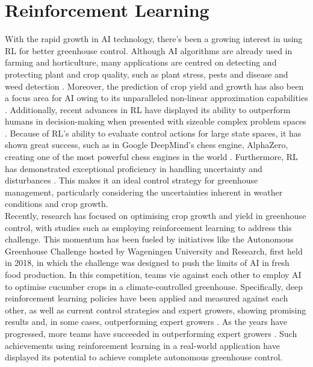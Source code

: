 \section{Reinforcement Learning}\label{section:RL}

With the rapid growth in AI technology, there’s been a growing interest in using RL for better greenhouse control. Although AI algorithms are already used in farming and horticulture, many applications are centred on detecting and protecting plant and crop quality, such as plant stress, pests and disease and weed detection \cite{hemmingCherryTomatoProduction2020}. Moreover, the prediction of crop yield and growth has also been a focus area for AI owing to its unparalleled non-linear approximation capabilities \cite{gongDeepLearningBased2021}. Additionally, recent advances in RL have displayed its ability to outperform humans in decision-making when presented with sizeable complex problem spaces \cite{bonsaiWhyReinforcementLearning2017}. Because of RL's ability to evaluate control actions for large state spaces, it has shown great success, such as in Google DeepMind's chess engine, AlphaZero, creating one of the most powerful chess engines in the world \cite{bertsekasLessonsAlphaZeroOptimal}. Furthermore, RL has demonstrated exceptional proficiency in handling uncertainty and disturbances \cite{daaboulUncertaintyPredictionModelbased2020}. This makes it an ideal control strategy for greenhouse management, particularly considering the uncertainties inherent in weather conditions and crop growth. \\

Recently, research has focused on optimising crop growth and yield in greenhouse control, with studies such as \cite{ajagekarDeepReinforcementLearning2022,wangDeepReinforcementLearning2020,ajagekarEnergyefficientAIbasedControl2023,decardi-nelsonbenjaminImprovingResourceUse2023,zhangRobustModelbasedReinforcement2021,jansenOptimalControlLettuce2023,vanmourikPlantPerformancePrecision2023} employing reinforcement learning to address this challenge. This momentum has been fueled by initiatives like the Autonomous Greenhouse Challenge hosted by Wageningen University and Research, first held in 2018, in which the challenge was designed to push the limits of AI in fresh food production. In this competition, teams vie against each other to employ AI to optimise cucumber crops in a climate-controlled greenhouse. Specifically, deep reinforcement learning policies have been applied and measured against each other, as well as current control strategies and expert growers, showing promising results and, in some cases, outperforming expert growers \cite{vandenbemdRobustDeepReinforcement,wangDeepReinforcementLearning2020}. As the years have progressed, more teams have succeeded in outperforming expert growers \cite{vandenbemdRobustDeepReinforcement,hemmingCherryTomatoProduction2020}. Such achievements using reinforcement learning in a real-world application have displayed its potential to achieve complete autonomous greenhouse control.

